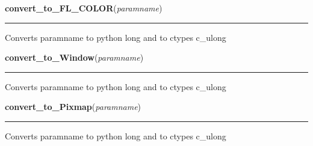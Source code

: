     \label{xformslib:library:convert_to_ulong}

    \vspace{0.5ex}

\hspace{.8\funcindent}\begin{boxedminipage}{\funcwidth}

    \raggedright \textbf{convert\_to\_FL\_COLOR}(\textit{paramname})

    \vspace{-1.5ex}

    \rule{\textwidth}{0.5\fboxrule}
\setlength{\parskip}{2ex}
    Converts paramname to python long and to ctypes c\_ulong

\setlength{\parskip}{1ex}
    \end{boxedminipage}

    \label{xformslib:library:convert_to_ulong}

    \vspace{0.5ex}

\hspace{.8\funcindent}\begin{boxedminipage}{\funcwidth}

    \raggedright \textbf{convert\_to\_Window}(\textit{paramname})

    \vspace{-1.5ex}

    \rule{\textwidth}{0.5\fboxrule}
\setlength{\parskip}{2ex}
    Converts paramname to python long and to ctypes c\_ulong

\setlength{\parskip}{1ex}
    \end{boxedminipage}

    \label{xformslib:library:convert_to_ulong}

    \vspace{0.5ex}

\hspace{.8\funcindent}\begin{boxedminipage}{\funcwidth}

    \raggedright \textbf{convert\_to\_Pixmap}(\textit{paramname})

    \vspace{-1.5ex}

    \rule{\textwidth}{0.5\fboxrule}
\setlength{\parskip}{2ex}
    Converts paramname to python long and to ctypes c\_ulong

\setlength{\parskip}{1ex}
    \end{boxedminipage}


